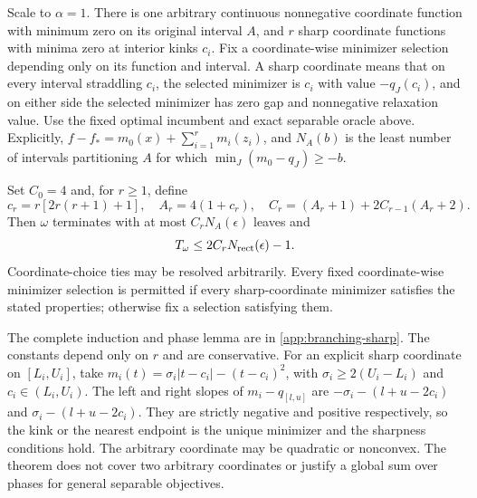 \begin{theorem}
\label{branching:sharp-induction}
Scale to $\alpha=1$. There is one arbitrary continuous nonnegative
coordinate function with minimum zero on its original interval $A$,
and $r$ sharp coordinate functions with
minima zero at interior kinks $c_i$. Fix a coordinate-wise minimizer
selection depending only on its function and interval. A sharp coordinate
means that on every interval straddling $c_i$, the selected minimizer is
$c_i$ with value $-q_J(c_i)$, and on either side the selected minimizer
has zero gap and nonnegative relaxation value. Use the fixed optimal
incumbent and exact separable oracle above.
Explicitly, $f-f_*=m_0(x)+\sum_{i=1}^rm_i(z_i)$, and $N_A(b)$
is the least number of intervals partitioning $A$ for which
$\min_J(m_0-q_J)\ge-b$.

Set $C_0=4$ and, for $r\ge1$, define
\[
 c_r=r[2r(r+1)+1],\quad A_r=4(1+c_r),\quad
 C_r=(A_r+1)+2C_{r-1}(A_r+2).
\]
Then $\omega$ terminates with at most $C_rN_A(\epsilon)$ leaves and
\[
 T_\omega\le2C_rN_{\rm rect}(\epsilon)-1.
\]
Coordinate-choice ties may be resolved arbitrarily. Every fixed
coordinate-wise minimizer selection is permitted if every sharp-coordinate
minimizer satisfies the stated properties; otherwise fix a selection
satisfying them.
\end{theorem}

The complete induction and phase lemma are in
\cref{app:branching-sharp}. The constants depend only on $r$ and are
conservative. For an explicit sharp coordinate on $[L_i,U_i]$, take
$m_i(t)=\sigma_i|t-c_i|-(t-c_i)^2$, with
$\sigma_i\ge2(U_i-L_i)$ and $c_i\in(L_i,U_i)$.
The left and right slopes of $m_i-q_{[l,u]}$ are
$-\sigma_i-(l+u-2c_i)$ and $\sigma_i-(l+u-2c_i)$.
They are strictly negative and positive respectively, so the kink or the
nearest endpoint is the unique minimizer and the sharpness conditions hold.
The arbitrary coordinate may be quadratic or nonconvex. The theorem does
not cover two
arbitrary coordinates or justify a global sum over phases for general
separable objectives.
